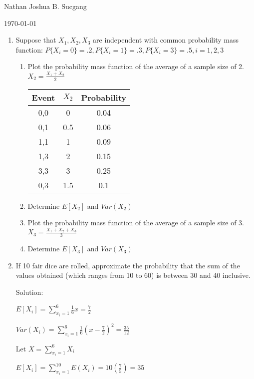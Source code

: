 \documentclass{article}
\begin{document}
Nathan Joshua B. Sucgang

\today

\begin{enumerate}
    \item Suppose that $X_1, X_2, X_3$ are independent with common probability mass function: $P\{X_i = 0 \} = .2, P\{X_i = 1 \} = .3, P\{X_i = 3 \} = .5, i = 1,2,3$
    \begin{enumerate}
        \item Plot the probability mass function of the average of a sample size of 2. $X_2 = \frac{X_1+X_2}{2}$
        
        \begin{tabular}{|c|c|c|}
            \hline
            \textbf{Event} & \bf{$X_2$} & \textbf{Probability} \\
            \hline
            0,0 & 0 & 0.04 \\
            0,1 & 0.5 & 0.06 \\
            1,1 & 1 & 0.09 \\
            1,3 & 2 & 0.15 \\
            3,3 & 3 & 0.25 \\
            0,3 & 1.5 & 0.1 \\
            \hline
            \end{tabular}
            
            
        \item Determine $E[X_2]$ and $Var(X_2)$
        \item Plot the probability mass function of the average of a sample size of 3. $X_3 = \frac{X_1+X_2+X_3}{3}$
        \item Determine $E[X_3]$ and $Var(X_3)$
    \end{enumerate}  
    \item If 10 fair dice are rolled, approximate the probability that the sum of the values obtained (which ranges from 10 to 60) is between 30 and 40 inclusive.
    
    Solution:

    $E[X_i] = \displaystyle \sum_{x_i = 1}^6 {\frac{1}{6}x = \frac{7}{2}}$

    $Var(X_i) = \displaystyle \sum_{x_i = 1}^6 {\frac{1}{6}{(x - \frac{7}{2})}^2 = \frac{35}{12}}$

    Let $X = \displaystyle \sum_{x_i = 1}^6 {X_i}$

    $E[X_i] = \displaystyle \sum_{x_i = 1}^{10} {E(X_i)} = 10(\frac{7}{5}) = 35$


\end{enumerate}
\end{document}
